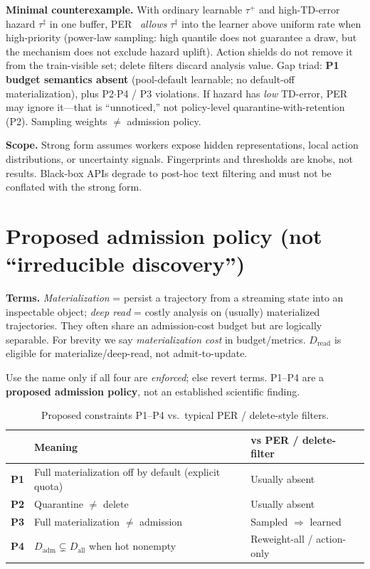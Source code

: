 \documentclass{article}
\begin{document}
\textbf{Minimal counterexample.} With ordinary learnable \(\tau^+\) and high-TD-error hazard \(\tau^\ddagger\) in one buffer, PER~\citep{schaul2016prioritized} \emph{allows} \(\tau^\ddagger\) into the learner above uniform rate when high-priority (power-law sampling: high quantile does not guarantee a draw, but the mechanism does not exclude hazard uplift). Action shields do not remove it from the train-visible set; delete filters discard analysis value. Gap triad: \textbf{P1 budget semantics absent} (pool-default learnable; no default-off materialization), plus P2$\cdot$P4 / P3 violations. If hazard has \emph{low} TD-error, PER may ignore it---that is ``unnoticed,'' not policy-level quarantine-with-retention (P2). Sampling weights \(\neq\) admission policy.

\textbf{Scope.} Strong form assumes workers expose hidden representations, local action distributions, or uncertainty signals. Fingerprints and thresholds are knobs, not results. Black-box APIs degrade to post-hoc text filtering and must not be conflated with the strong form.

\section{Proposed admission policy (not ``irreducible discovery'')}
\label{sec:policy}

\textbf{Terms.} \emph{Materialization} = persist a trajectory from a streaming state into an inspectable object; \emph{deep read} = costly analysis on (usually) materialized trajectories. They often share an admission-cost budget but are logically separable. For brevity we say \emph{materialization cost} in budget/metrics. \(D_{\mathrm{read}}\) is eligible for materialize/deep-read, not admit-to-update.

Use the name only if all four are \emph{enforced}; else revert terms. P1--P4 are a \textbf{proposed admission policy}, not an established scientific finding.

\begin{table}[t]
\centering
\caption{Proposed constraints P1--P4 vs.\ typical PER / delete-style filters.}
\label{tab:p14}
\small
\begin{tabular}{@{}p{1.6cm}p{4.2cm}p{5.2cm}@{}}
\toprule
\textbf{} & \textbf{Meaning} & \textbf{vs PER / delete-filter} \\
\midrule
\textbf{P1} & Full materialization off by default (explicit quota) & Usually absent \\
\textbf{P2} & Quarantine \(\neq\) delete & Usually absent \\
\textbf{P3} & Full materialization \(\neq\) admission & Sampled \(\Rightarrow\) learned \\
\textbf{P4} & \(D_{\mathrm{adm}}\subsetneq D_{\mathrm{all}}\) when hot nonempty & Reweight-all / action-only \\
\bottomrule
\end{tabular}
\end{table}
\end{document}
